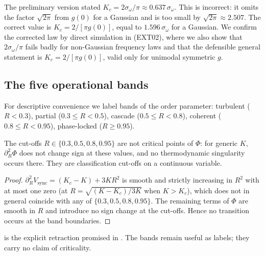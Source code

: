 \documentclass[11pt,twocolumn,a4paper]{article}
\newcommand{\Pot}{\Phi}
\newcommand{\Kc}{K_c}
\newcommand{\Ord}{R}
\begin{document}
\begin{remark}\label{rem:Kc-correction}
The preliminary version stated $\Kc=2\sigma_\omega/\pi\approx0.637\,\sigma_\omega$.
This is incorrect: it omits the factor $\sqrt{2\pi}$ from $g(0)$ for a Gaussian
and is too small by $\sqrt{2\pi}\approx2.507$. The correct value is
$\Kc=2/[\pi g(0)]$, equal to $1.596\,\sigma_\omega$ for a Gaussian. We confirm
the corrected law by direct simulation in  (EXT02), where we
also show that $2\sigma_\omega/\pi$ fails badly for non-Gaussian frequency laws
and that the defensible general statement is $\Kc=2/[\pi g(0)]$, valid only for
unimodal symmetric $g$.
\end{remark}

\subsection{The five operational bands}

\begin{definition}\label{def:bands}
For descriptive convenience we label bands of the order parameter:
turbulent ($\Ord<0.3$), partial ($0.3\le\Ord<0.5$), cascade
($0.5\le\Ord<0.8$), coherent ($0.8\le\Ord<0.95$), phase-locked
($\Ord\ge0.95$).
\end{definition}

\begin{proposition}\label{prop:not-transitions}
The cut-offs $\Ord\in\{0.3,0.5,0.8,0.95\}$ are not critical points of $\Pot$:
for generic $K$, $\partial^2_\Ord\Pot$ does not change sign at these values, and
no thermodynamic singularity occurs there. They are classification cut-offs on
a continuous variable.
\end{proposition}

\begin{proof}
$\partial^2_\Ord V_{\mathrm{sync}}=(\Kc-K)+3K\Ord^2$ is smooth and strictly
increasing in $\Ord^2$ with at most one zero (at $\Ord=\sqrt{(K-\Kc)/3K}$ when
$K>\Kc$), which does not in general coincide with any of
$\{0.3,0.5,0.8,0.95\}$. The remaining terms of $\Pot$ are smooth in $\Ord$ and
introduce no sign change at the cut-offs. Hence no transition occurs at the band
boundaries.
\end{proof}

\begin{remark}
 is the explicit retraction promised in
. The bands remain useful as labels; they carry no claim of
criticality.
\end{remark}
\end{document}
